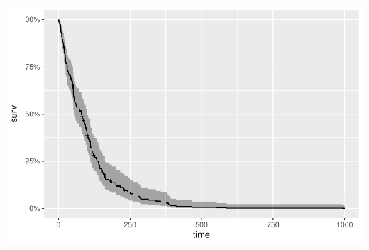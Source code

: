\documentclass[a4paper, oneside]{book}\usepackage[]{graphicx}\usepackage[]{color}
\makeatletter
\def\maxwidth{ %
  \ifdim\Gin@nat@width>\linewidth
    \linewidth
  \else
    \Gin@nat@width
  \fi
}
\newenvironment{knitrout}{}{} %
\makeatother
\begin{document}
\begin{knitrout}
{\centering \includegraphics[width=\maxwidth]{figure/script6-1} 

}



\end{knitrout}
\end{document}
